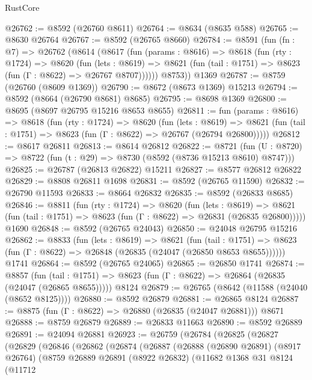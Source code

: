 \begin{lexlean}{RustCore}
\begin{coremodule}
@26762 := @8592 (@26760 @8611)
@26764 := @8634 (@8635 @588)
@26765 := @8630 @26764
@26767 := @8592 (@26765 @8660)
@26784 := @8591
    (fun (fn : @7) =>
    @26762
      (@8614
        (@8617
          (fun (params : @8616) =>
          @8618
            (fun (rty : @1724) =>
            @8620
              (fun (lets : @8619) =>
              @8621 (fun (tail : @1751) => @8623 (fun (Γ : @8622) => @26767 @8707))))))
        @8753))
    @1369
@26787 := @8759 (@26760 (@8609 @1369))
@26790 := @8672 (@8673 @1369) @15213
@26794 := @8592 (@8664 (@26790 @8681) @8685)
@26795 := @8698 @1369
@26800 := @8695 (@8697 @26795 @15216 @8653 @8655)
@26811 := fun (params : @8616) =>
  @8618
    (fun (rty : @1724) =>
    @8620
      (fun (lets : @8619) =>
      @8621 (fun (tail : @1751) => @8623 (fun (Γ : @8622) => @26767 (@26794 @26800)))))
@26812 := @8617 @26811
@26813 := @8614 @26812
@26822 := @8721
    (fun (U : @8720) => @8722 (fun (t : @29) => @8730 (@8592 (@8736 @15213 @8610) @8747)))
@26825 := @26787 (@26813 @26822) @15211
@26827 := @8577 @26812 @26822
@26829 := @8808 @26811 @1698
@26831 := @8592 (@26765 @11590)
@26832 := @26790 @11593
@26833 := @8664 @26832
@26835 := @8592 (@26833 @8685)
@26846 := @8811
    (fun (rty : @1724) =>
    @8620
      (fun (lets : @8619) =>
      @8621 (fun (tail : @1751) => @8623 (fun (Γ : @8622) => @26831 (@26835 @26800)))))
    @1690
@26848 := @8592 (@26765 @24043)
@26850 := @24048 @26795 @15216
@26862 := @8833
    (fun (lets : @8619) =>
    @8621
      (fun (tail : @1751) =>
      @8623 (fun (Γ : @8622) => @26848 (@26835 (@24047 (@26850 @8653 @8655))))))
    @1741
@26864 := @8592 (@26765 @24065)
@26865 := @26850 @1741
@26874 := @8857
    (fun (tail : @1751) => @8623 (fun (Γ : @8622) => @26864 (@26835 (@24047 (@26865 @8655)))))
    @8124
@26879 := @26765 (@8642 (@11588 (@24040 (@8652 @8125))))
@26880 := @8592 @26879
@26881 := @26865 @8124
@26887 := @8875 (fun (Γ : @8622) => @26880 (@26835 (@24047 @26881))) @8671
@26888 := @8759 @26879
@26889 := @26833 @11663
@26890 := @8592 @26889
@26891 := @24094 @26881
@26923 := @26759
    (@26784
      (@26825
        (@26827
          (@26829
            (@26846
              (@26862
                (@26874
                  (@26887
                    (@26888
                      (@26890 @26891)
                      (@8917 @26764)
                      (@8759
                        @26889
                        @26891
                        (@8922 @26832)
                        (@11682
                          @1368
                          @31
                          @8124
                          (@11712

\end{coremodule}
\end{lexlean}
